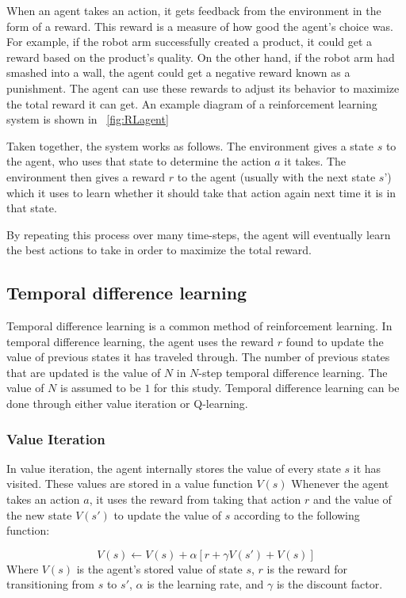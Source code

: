 \documentclass[12pt]{thesis}
\begin{document}
When an agent takes an action, it gets feedback from the environment in the form of a reward. This reward is a measure of how good the agent’s choice was. For example, if the robot arm successfully created a product, it could get a reward based on the product’s quality. On the other hand, if the robot arm had smashed into a wall, the agent could get a negative reward known as a punishment. The agent can use these rewards to adjust its behavior to maximize the total reward it can get. An example diagram of a reinforcement learning system is shown in \figurename~\ref{fig:RLagent} 

Taken together, the system works as follows. The environment gives a state $s$ to the agent, who uses that state to determine the action $a$ it takes. The environment then gives a reward $r$ to the agent (usually with the next state $s’$) which it uses to learn whether it should take that action again next time it is in that state.

By repeating this process over many time-steps, the agent will eventually learn the best actions to take in order to maximize the total reward.

\subsection{Temporal difference learning}
Temporal difference learning is a common method of reinforcement learning. In temporal difference learning, the agent uses the reward $r$ found to update the value of previous states it has traveled through. The number of previous states that are updated is the value of $N$ in $N$-step temporal difference learning. The value of $N$ is assumed to be $1$ for this study. Temporal difference learning can be done through either value iteration or Q-learning. \cite{Sutton1998}\cite{Ladosz_2022}
\subsubsection{Value Iteration}
In value iteration, the agent internally stores the value of every state $s$ it has visited. These values are stored in a value function $V(s)$ Whenever the agent takes an action $a$, it uses the reward from taking that action $r$ and the value of the new state $V(s')$ to update the value of $s$ according to the following function:

\begin{equation}
V(s) \leftarrow V(s) + \alpha [r + \gamma V(s') + V(s)]
\label{TDLVF}
\end{equation}
Where $V(s)$ is the agent's stored value of state $s$, $r$ is the reward for transitioning from $s$ to $s'$, $\alpha$ is the learning rate, and $\gamma$ is the discount factor.\cite{Sutton1998}
\end{document}
